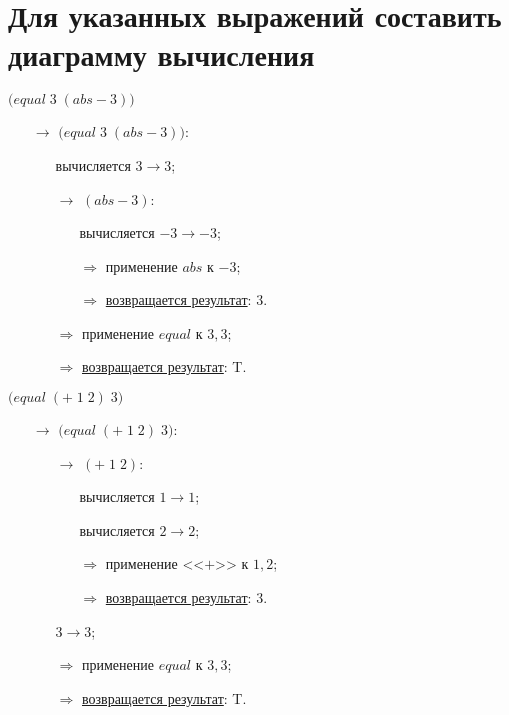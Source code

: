
\section{Для указанных выражений составить диаграмму вычисления}

\vfill
\problem $\bigl(equal\; 3\; (abs -\!3)\bigr)$

\begin{itemize}
	\item[$\longrightarrow$]$\bigl(equal\; 3\; (abs -\!3)\bigr)$:
	\begin{itemize}
		\item[\textbullet] вычисляется $3 \to 3$;
		\item[$\longrightarrow$] $(abs -\!3)$:
		\begin{itemize}
			\item[\textbullet] вычисляется $-3 \to -3$;
			\item[$\Longrightarrow$] применение $abs$ к $-3$;
			\item[$\Longrightarrow$] \underline{возвращается результат}: $3$.
		\end{itemize}
		\item[$\Longrightarrow$] применение $equal$ к $3, 3$;
		\item[$\Longrightarrow$] \underline{возвращается результат}: T.
	\end{itemize}
\end{itemize}
\vfill


\problem $\bigl(equal\; (+\; 1\; 2)\; 3\bigr)$

\begin{itemize}
	\item[$\longrightarrow$] $\bigl(equal\; (+\; 1\; 2)\; 3\bigr)$:
	\begin{itemize}
		\item[$\longrightarrow$] $(+\; 1\; 2)$:
		\begin{itemize}
			\item[\textbullet] вычисляется $1 \to 1$;
			\item[\textbullet] вычисляется $2 \to 2$;
			\item[$\Longrightarrow$] применение <<$+$>> к $1, 2$;
			\item[$\Longrightarrow$] \underline{возвращается результат}: $3$.
		\end{itemize}
		\item[\textbullet] $3 \to 3$;
		\item[$\Longrightarrow$] применение $equal$ к $3, 3$;
		\item[$\Longrightarrow$] \underline{возвращается результат}: T.
	\end{itemize}
\end{itemize}
\vfill


